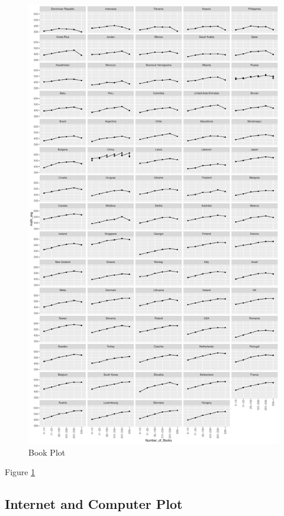 \begin{Schunk}
\begin{figure}[H]
\includegraphics[width=1\linewidth]{learningtower_files/figure-latex/book-plot-1} \caption[Book Plot]{Book Plot}\label{fig:book-plot}
\end{figure}
\end{Schunk}

Figure \ref{fig:book-plot}

\hypertarget{internet-and-computer-plot}{%
\subsection{Internet and Computer
Plot}\label{internet-and-computer-plot}}

